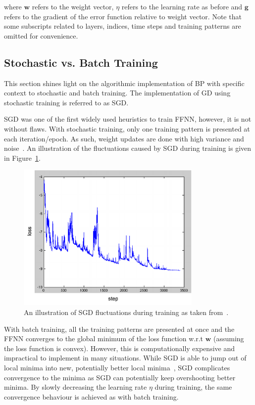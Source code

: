 where $\boldsymbol{w}$ refers to the weight vector, $\eta$ refers to the learning rate as before and $\boldsymbol{g}$ refers to the gradient of the error function relative to weight vector. Note that some subscripts related to layers, indices, time steps and training patterns are omitted for convenience.

\subsection{Stochastic vs. Batch Training}\label{sec:heuristics:gd:sgd}

This section shines light on the algorithmic implementation of \acs{BP} with specific context to stochastic and batch training. The implementation of \acs{GD} using stochastic training is referred to as \acf{SGD}.

\acs{SGD} was one of the first widely used heuristics to train \acs{FFNN}, however, it is not without flaws. With stochastic training, only one training pattern is presented at each iteration/epoch. As such, weight updates are done with high variance and noise~\cite{ref:ruder:2016}. An illustration of the fluctuations caused by \acs{SGD} during training is given in Figure~\ref{fig:heuristics:gd:sgd}.

\begin{figure}[htbp]
      \centering
      \includegraphics[width=0.8\textwidth]{images/sgd.pdf}
      \caption{An illustration of \acf{SGD} fluctuations during training as taken from~\cite{ref:sgd:2006}.}
      \label{fig:heuristics:gd:sgd}
\end{figure}

With batch training, all the training patterns are presented at once and the \acs{FFNN} converges to the global minimum of the loss function w.r.t $\boldsymbol{w}$ (assuming the loss function is convex). However, this is computationally expensive and impractical to implement in many situations. While \acs{SGD} is able to jump out of local minima into new, potentially better local minima~\cite{ref:ruder:2016}, \acs{SGD} complicates convergence to the minima as \acs{SGD} can potentially keep overshooting better minima. By slowly decreasing the learning rate $\eta$ during training, the same convergence behaviour is achieved as with batch training.

